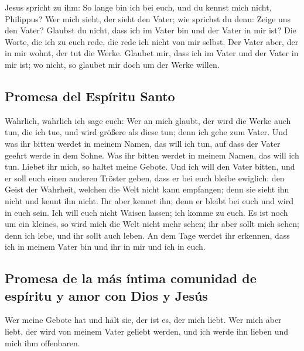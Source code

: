  Jesus spricht zu ihm: So lange bin ich bei euch, und du
kennst mich nicht, Philippus? Wer mich sieht, der sieht den Vater; wie
sprichst du denn: Zeige uns den Vater?  Glaubst du nicht,
dass ich im Vater bin und der Vater in mir ist? Die Worte, die ich zu
euch rede, die rede ich nicht von mir selbst. Der Vater aber, der in mir
wohnt, der tut die Werke.  Glaubet mir, dass ich im Vater
und der Vater in mir ist; wo nicht, so glaubet mir doch um der Werke
willen.

\hypertarget{promesa-del-espuxedritu-santo}{%
\subsection{Promesa del Espíritu
Santo}\label{promesa-del-espuxedritu-santo}}

 Wahrlich, wahrlich ich sage euch: Wer an mich glaubt,
der wird die Werke auch tun, die ich tue, und wird größere als diese
tun; denn ich gehe zum Vater.  Und was ihr bitten werdet
in meinem Namen, das will ich tun, auf dass der Vater geehrt werde in
dem Sohne.  Was ihr bitten werdet in meinem Namen, das
will ich tun.  Liebet ihr mich, so haltet meine Gebote.
 Und ich will den Vater bitten, und er soll euch einen
anderen Tröster geben, dass er bei euch bleibe ewiglich: 
den Geist der Wahrheit, welchen die Welt nicht kann empfangen; denn sie
sieht ihn nicht und kennt ihn nicht. Ihr aber kennet ihn; denn er bleibt
bei euch und wird in euch sein.  Ich will euch nicht
Waisen lassen; ich komme zu euch.  Es ist noch um ein
kleines, so wird mich die Welt nicht mehr sehen; ihr aber sollt mich
sehen; denn ich lebe, und ihr sollt auch leben.  An dem
Tage werdet ihr erkennen, dass ich in meinem Vater bin und ihr in mir
und ich in euch.

\hypertarget{promesa-de-la-muxe1s-uxedntima-comunidad-de-espuxedritu-y-amor-con-dios-y-jesuxfas}{%
\subsection{Promesa de la más íntima comunidad de espíritu y amor con
Dios y
Jesús}\label{promesa-de-la-muxe1s-uxedntima-comunidad-de-espuxedritu-y-amor-con-dios-y-jesuxfas}}

 Wer meine Gebote hat und hält sie, der ist es, der mich
liebt. Wer mich aber liebt, der wird von meinem Vater geliebt werden,
und ich werde ihn lieben und mich ihm offenbaren.


